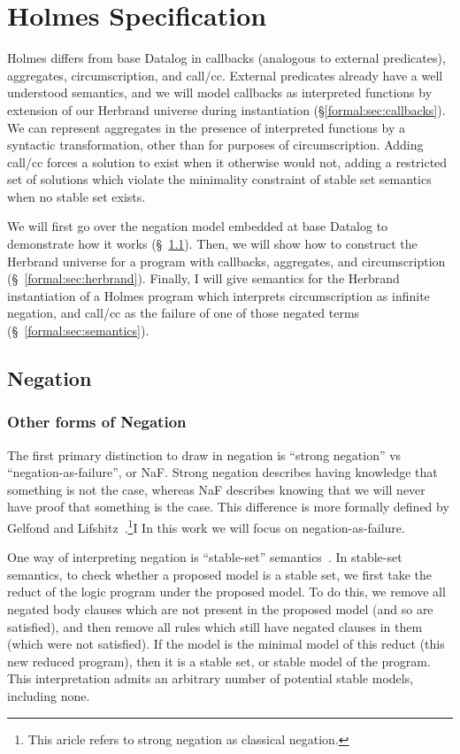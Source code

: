 
\chapter{Holmes Specification}
\label{chap:formal}
Holmes differs from base Datalog in callbacks (analogous to external predicates), aggregates, circumscription, and call/cc.
External predicates already have a well understood semantics, and we will model callbacks as interpreted functions by extension of our Herbrand universe during instantiation (\S \ref{formal:sec:callbacks}).
We can represent aggregates in the presence of interpreted functions by a syntactic transformation, other than for purposes of circumscription.
Adding call/cc forces a solution to exist when it otherwise would not, adding a restricted set of solutions which violate the minimality constraint of stable set semantics when no stable set exists.

We will first go over the negation model embedded at base Datalog to demonstrate how it works (\S~\ref{formal:sec:negation}).
Then, we will show how to construct the Herbrand universe for a program with callbacks, aggregates, and circumscription (\S~\ref{formal:sec:herbrand}).
Finally, I will give semantics for the Herbrand instantiation of a Holmes program which interprets circumscription as infinite negation, and call/cc as the failure of one of those negated terms (\S~\ref{formal:sec:semantics}).
\section{Negation}
\label{formal:sec:negation}
\subsection{Other forms of Negation}
\label{formal:sec:otherneg}
The first primary distinction to draw in negation is ``strong negation'' vs ``negation-as-failure'', or NaF.
Strong negation describes having knowledge that something is not the case, whereas NaF describes knowing that we will never have proof that something is the case.
This difference is more formally defined by Gelfond and Lifshitz~\cite{strongneg}.\footnote{
This aricle refers to strong negation as classical negation.
}I
In this work we will focus on negation-as-failure.

One way of interpreting negation is ``stable-set'' semantics~\cite{stablemodel}.
In stable-set semantics, to check whether a proposed model is a stable set, we first take the reduct of the logic program under the proposed model.
To do this, we remove all negated body clauses which are not present in the proposed model (and so are satisfied), and then remove all rules which still have negated clauses in them (which were not satisfied).
If the model is the minimal model of this reduct (this new reduced program), then it is a stable set, or stable model of the program.
This interpretation admits an arbitrary number of potential stable models, including none.

